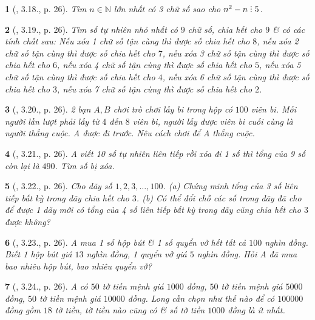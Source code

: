 \documentclass{article}
\newtheorem{baitoan}{}
\DeclareRobustCommand{\divby}{%
	\mathrel{\vbox{\baselineskip.65ex\lineskiplimit0pt\hbox{.}\hbox{.}\hbox{.}}}%
}
\begin{document}
\begin{baitoan}[\cite{TLCT_THCS_Toan_6_so_hoc}, 3.18., p. 26]
	Tìm $n\in\mathbb{N}$ lớn nhất có 3 chữ số sao cho $n^2 - n\divby5$.
\end{baitoan}

\begin{baitoan}[\cite{TLCT_THCS_Toan_6_so_hoc}, 3.19., p. 26]
	Tìm số tự nhiên nhỏ nhất có $9$ chữ số, chia hết cho $9$ \& có các tính chất sau: Nếu xóa 1 chữ số tận cùng thì được số chia hết cho $8$, nếu xóa 2 chữ số tận cùng thì được số chia hết cho $7$, nếu xóa 3 chữ số tận cùng thì được số chia hết cho $6$, nếu xóa 4 chữ số tận cùng thì được số chia hết cho $5$, nếu xóa 5 chữ số tận cùng thì được số chia hết cho $4$, nếu xóa 6 chữ số tận cùng thì được số chia hết cho $3$, nếu xóa 7 chữ số tận cùng thì được số chia hết cho $2$.
\end{baitoan}

\begin{baitoan}[\cite{TLCT_THCS_Toan_6_so_hoc}, 3.20., p. 26]
	2 bạn $A,B$ chơi trò chơi lấy bi trong hộp có $100$ viên bi. Mỗi người lần lượt phải lấy từ $4$ đến $8$ viên bi, người lấy được viên bi cuối cùng là người thắng cuộc. A được đi trước. Nêu cách chơi để A thắng cuộc.
\end{baitoan}

\begin{baitoan}[\cite{TLCT_THCS_Toan_6_so_hoc}, 3.21., p. 26]
	A viết 10 số tự nhiên liên tiếp rồi xóa đi 1 số thì tổng của 9 số còn lại là $490$. Tìm số bị xóa.
\end{baitoan}

\begin{baitoan}[\cite{TLCT_THCS_Toan_6_so_hoc}, 3.22., p. 26]
	Cho dãy số $1,2,3,\ldots,100$. (a) Chứng minh tổng của 3 số liên tiếp bất kỳ trong dãy chia hết cho $3$. (b) Có thể đổi chỗ các số trong dãy đã cho để được 1 dãy mới có tổng của 4 số liên tiếp bất kỳ trong dãy cũng chia hết cho $3$ được không?
\end{baitoan}

\begin{baitoan}[\cite{TLCT_THCS_Toan_6_so_hoc}, 3.23., p. 26]
	A mua 1 số hộp bút \& 1 số quyển vở hết tất cả $100$ nghìn đồng. Biết 1 hộp bút giá $13$ nghìn đồng, 1 quyển vở giá $5$ nghìn đồng. Hỏi A đã mua bao nhiêu hộp bút, bao nhiêu quyển vở?
\end{baitoan}

\begin{baitoan}[\cite{TLCT_THCS_Toan_6_so_hoc}, 3.24., p. 26]
	A có $50$ tờ tiền mệnh giá $1000$ đồng, $50$ tờ tiền mệnh giá $5000$ đồng, $50$ tờ tiền mệnh giá $10000$ đồng. Long cần chọn như thế nào để có $100000$ đồng gồm $18$ tờ tiền, tờ tiền nào cũng có \& số tờ tiền $1000$ đồng là ít nhất.
\end{baitoan}
\end{document}
